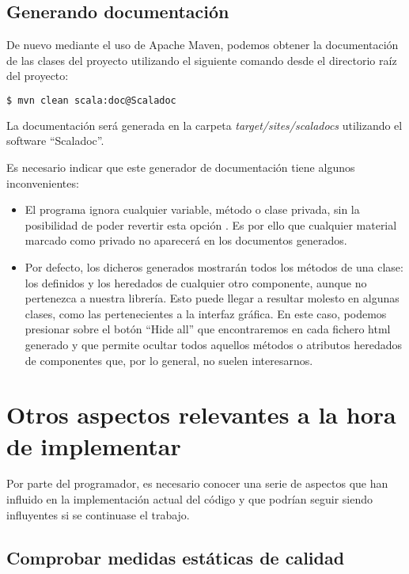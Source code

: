 \subsection{Generando documentación}\label{subsec:documentacion}

De nuevo mediante el uso de Apache Maven, podemos obtener la documentación de las clases del proyecto utilizando el siguiente comando desde el directorio raíz del proyecto:

\begin{lstlisting}[language=bash]
$ mvn clean scala:doc@Scaladoc
\end{lstlisting}

La documentación será generada en la carpeta \textit{target/sites/scaladocs} utilizando el software ``Scaladoc''.

Es necesario indicar que este generador de documentación tiene algunos inconvenientes:
\begin{itemize}
\item El programa ignora cualquier variable, método o clase privada, sin la posibilidad de poder revertir esta opción \cite{issueAccess}. Es por ello que cualquier material marcado como privado no aparecerá en los documentos generados.
\item Por defecto, los dicheros generados mostrarán todos los métodos de una clase: los definidos y los heredados de cualquier otro componente, aunque no pertenezca a nuestra librería. Esto puede llegar a resultar molesto en algunas clases, como las pertenecientes a la interfaz gráfica. En este caso, podemos presionar sobre el botón ``Hide all'' que encontraremos en cada fichero html generado y que permite ocultar todos aquellos métodos o atributos heredados de componentes que, por lo general, no suelen interesarnos.
\end{itemize}
 


\section{Otros aspectos relevantes a la hora de implementar}

Por parte del programador, es necesario conocer una serie de aspectos que han influido en la implementación actual del código y que podrían seguir siendo influyentes si se continuase el trabajo.

\subsection{Comprobar medidas estáticas de calidad}


